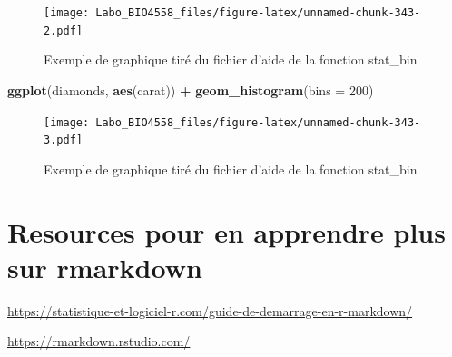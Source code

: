 \documentclass[12pt,]{book}
\newenvironment{Shaded}{\begin{snugshade}}{\end{snugshade}}
\newcommand{\DataTypeTok}[1]{\textcolor[rgb]{0.13,0.29,0.53}{#1}}
\newcommand{\DecValTok}[1]{\textcolor[rgb]{0.00,0.00,0.81}{#1}}
\newcommand{\KeywordTok}[1]{\textcolor[rgb]{0.13,0.29,0.53}{\textbf{#1}}}
\newcommand{\NormalTok}[1]{#1}
\newcommand{\OperatorTok}[1]{\textcolor[rgb]{0.81,0.36,0.00}{\textbf{#1}}}
\newcommand{\StringTok}[1]{\textcolor[rgb]{0.31,0.60,0.02}{#1}}
\begin{document}
\begin{figure}
\centering
\texttt{[image: Labo\_BIO4558\_files/figure-latex/unnamed-chunk-343-2.pdf]}
\caption{\label{fig:unnamed-chunk-343-2}Exemple de graphique tiré du fichier d'aide de la fonction stat\_bin}
\end{figure}

\begin{Shaded}
\begin{Highlighting}[]
\KeywordTok{ggplot}\NormalTok{(diamonds, }\KeywordTok{aes}\NormalTok{(carat)) }\OperatorTok{+}
\StringTok{  }\KeywordTok{geom_histogram}\NormalTok{(}\DataTypeTok{bins =} \DecValTok{200}\NormalTok{)}
\end{Highlighting}
\end{Shaded}

\begin{figure}
\centering
\texttt{[image: Labo\_BIO4558\_files/figure-latex/unnamed-chunk-343-3.pdf]}
\caption{\label{fig:unnamed-chunk-343-3}Exemple de graphique tiré du fichier d'aide de la fonction stat\_bin}
\end{figure}

\hypertarget{resources-pour-en-apprendre-plus-sur-rmarkdown}{%
\chapter{Resources pour en apprendre plus sur rmarkdown}\label{resources-pour-en-apprendre-plus-sur-rmarkdown}}

\url{https://statistique-et-logiciel-r.com/guide-de-demarrage-en-r-markdown/}

\url{https://rmarkdown.rstudio.com/}

\printindex
\end{document}
